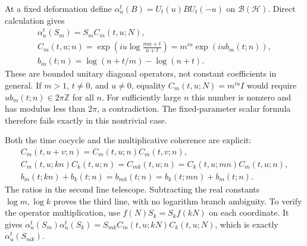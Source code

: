 At a fixed deformation define
$\alpha_u^t(B)=U_t(u)BU_t(-u)$ on
$\mathcal B(\mathcal H)$. Direct calculation gives
\begin{equation}\tag{HPS7}
\begin{gathered}
 \alpha_u^t(S_m)=S_mC_m(t,u;N),\\
 C_m(t,u;n)=
       \exp\!\left(iu\log\frac{mn+t}{n+t}\right)
       =m^{iu}\exp(iu b_m(t;n)),\\
 b_m(t;n)=\log(n+t/m)-\log(n+t).
\end{gathered}
\end{equation}
These are bounded unitary diagonal operators, not
constant coefficients in general. If $m>1$, $t\ne0$,
and $u\ne0$, equality $C_m(t,u;N)=m^{iu}I$
would require $u b_m(t;n)\in2\pi\mathbb Z$ for all
$n$. For sufficiently large $n$ this number is
nonzero and has modulus less than $2\pi$, a
contradiction. The fixed-parameter scalar formula
therefore fails exactly in this nontrivial case.

Both the time cocycle and the multiplicative
coherence are explicit:
\begin{equation}\tag{HPS8}
\begin{gathered}
 C_m(t,u+v;n)=C_m(t,u;n)C_m(t,v;n),\\
 C_m(t,u;kn)C_k(t,u;n)=C_{mk}(t,u;n)
                    =C_k(t,u;mn)C_m(t,u;n),\\
 b_m(t;kn)+b_k(t;n)=b_{mk}(t;n)
                    =b_k(t;mn)+b_m(t;n).
\end{gathered}
\end{equation}
The ratios in the second line telescope.
Subtracting the real constants $\log m,\log k$
proves the third line, with no logarithm branch
ambiguity. To verify the operator multiplication,
use $f(N)S_k=S_kf(kN)$ on each coordinate.
It gives
$\alpha_u^t(S_m)\alpha_u^t(S_k)
=S_{mk}C_m(t,u;kN)C_k(t,u;N)$,
which is exactly $\alpha_u^t(S_{mk})$.

